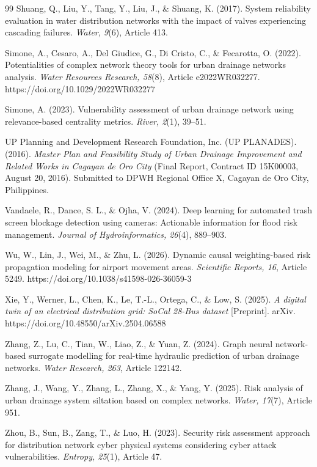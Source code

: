 \begin{thebibliography}{99}
Shuang, Q., Liu, Y., Tang, Y., Liu, J., \& Shuang, K. (2017). System reliability evaluation in water distribution networks with the impact of valves experiencing cascading failures. \textit{Water, 9}(6), Article 413.

Simone, A., Cesaro, A., Del Giudice, G., Di Cristo, C., \& Fecarotta, O. (2022). Potentialities of complex network theory tools for urban drainage networks analysis. \textit{Water Resources Research, 58}(8), Article e2022WR032277. https://doi.org/10.1029/2022WR032277

Simone, A. (2023). Vulnerability assessment of urban drainage network using relevance-based centrality metrics. \textit{River, 2}(1), 39--51.

UP Planning and Development Research Foundation, Inc. (UP PLANADES). (2016). \textit{Master Plan and Feasibility Study of Urban Drainage Improvement and Related Works in Cagayan de Oro City} (Final Report, Contract ID 15K00003, August 20, 2016). Submitted to DPWH Regional Office X, Cagayan de Oro City, Philippines.

Vandaele, R., Dance, S. L., \& Ojha, V. (2024). Deep learning for automated trash screen blockage detection using cameras: Actionable information for flood risk management. \textit{Journal of Hydroinformatics, 26}(4), 889--903.

Wu, W., Lin, J., Wei, M., \& Zhu, L. (2026). Dynamic causal weighting-based risk propagation modeling for airport movement areas. \textit{Scientific Reports, 16}, Article 5249. https://doi.org/10.1038/s41598-026-36059-3

Xie, Y., Werner, L., Chen, K., Le, T.-L., Ortega, C., \& Low, S. (2025). \textit{A digital twin of an electrical distribution grid: SoCal 28-Bus dataset} [Preprint]. arXiv. https://doi.org/10.48550/arXiv.2504.06588

Zhang, Z., Lu, C., Tian, W., Liao, Z., \& Yuan, Z. (2024). Graph neural network-based surrogate modelling for real-time hydraulic prediction of urban drainage networks. \textit{Water Research, 263}, Article 122142.

Zhang, J., Wang, Y., Zhang, L., Zhang, X., \& Yang, Y. (2025). Risk analysis of urban drainage system siltation based on complex networks. \textit{Water, 17}(7), Article 951.

Zhou, B., Sun, B., Zang, T., \& Luo, H. (2023). Security risk assessment approach for distribution network cyber physical systems considering cyber attack vulnerabilities. \textit{Entropy, 25}(1), Article 47.

\end{thebibliography}
